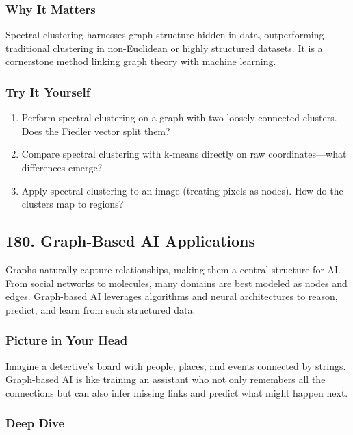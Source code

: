 \documentclass[
  letterpaper,
  DIV=11,
  numbers=noendperiod]{scrreprt}
\providecommand{\tightlist}{%
  \setlength{\itemsep}{0pt}\setlength{\parskip}{0pt}}
\begin{document}
\subsubsection{Why It Matters}\label{why-it-matters-76}

Spectral clustering harnesses graph structure hidden in data,
outperforming traditional clustering in non-Euclidean or highly
structured datasets. It is a cornerstone method linking graph theory
with machine learning.

\subsubsection{Try It Yourself}\label{try-it-yourself-178}

\begin{enumerate}
\def\labelenumi{\arabic{enumi}.}
\tightlist
\item
  Perform spectral clustering on a graph with two loosely connected
  clusters. Does the Fiedler vector split them?
\item
  Compare spectral clustering with k-means directly on raw
  coordinates---what differences emerge?
\item
  Apply spectral clustering to an image (treating pixels as nodes). How
  do the clusters map to regions?
\end{enumerate}

\subsection{180. Graph-Based AI
Applications}\label{graph-based-ai-applications}

Graphs naturally capture relationships, making them a central structure
for AI. From social networks to molecules, many domains are best modeled
as nodes and edges. Graph-based AI leverages algorithms and neural
architectures to reason, predict, and learn from such structured data.

\subsubsection{Picture in Your Head}\label{picture-in-your-head-179}

Imagine a detective's board with people, places, and events connected by
strings. Graph-based AI is like training an assistant who not only
remembers all the connections but can also infer missing links and
predict what might happen next.

\subsubsection{Deep Dive}\label{deep-dive-179}
\end{document}
